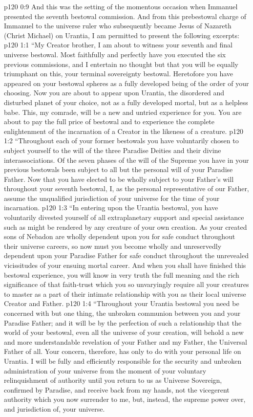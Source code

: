 \vs p120 0:9 \pc And this was the setting of the momentous occasion when Immanuel presented the seventh bestowal commission. And from this prebestowal charge of Immanuel to the universe ruler who subsequently became Jesus of Nazareth (Christ Michael) on Urantia, I am permitted to present the following excerpts:
\vs p120 1:1 “My Creator brother, I am about to witness your seventh and final universe bestowal. Most faithfully and perfectly have you executed the six previous commissions, and I entertain no thought but that you will be equally triumphant on this, your terminal sovereignty bestowal. Heretofore you have appeared on your bestowal spheres as a fully developed being of the order of your choosing. Now you are about to appear upon Urantia, the disordered and disturbed planet of your choice, not as a fully developed mortal, but as a helpless babe. This, my comrade, will be a new and untried experience for you. You are about to pay the full price of bestowal and to experience the complete enlightenment of the incarnation of a Creator in the likeness of a creature.
\vs p120 1:2 “Throughout each of your former bestowals you have voluntarily chosen to subject yourself to the will of the three Paradise Deities and their divine interassociations. Of the seven phases of the will of the Supreme you have in your previous bestowals been subject to all but the personal will of your Paradise Father. Now that you have elected to be wholly subject to your Father’s will throughout your seventh bestowal, I, as the personal representative of our Father, assume the unqualified jurisdiction of your universe for the time of your incarnation.
\vs p120 1:3 “In entering upon the Urantia bestowal, you have voluntarily divested yourself of all extraplanetary support and special assistance such as might be rendered by any creature of your own creation. As your created sons of Nebadon are wholly dependent upon you for safe conduct throughout their universe careers, so now must you become wholly and unreservedly dependent upon your Paradise Father for safe conduct throughout the unrevealed vicissitudes of your ensuing mortal career. And when you shall have finished this bestowal experience, you will know in very truth the full meaning and the rich significance of that faith\hyp{}trust which you so unvaryingly require all your creatures to master as a part of their intimate relationship with you as their local universe Creator and Father.
\vs p120 1:4 “Throughout your Urantia bestowal you need be concerned with but one thing, the unbroken communion between you and your Paradise Father; and it will be by the perfection of such a relationship that the world of your bestowal, even all the universe of your creation, will behold a new and more understandable revelation of your Father and my Father, the Universal Father of all. Your concern, therefore, has only to do with your personal life on Urantia. I will be fully and efficiently responsible for the security and unbroken administration of your universe from the moment of your voluntary relinquishment of authority until you return to us as Universe Sovereign, confirmed by Paradise, and receive back from my hands, not the vicegerent authority which you now surrender to me, but, instead, the supreme power over, and jurisdiction of, your universe.
